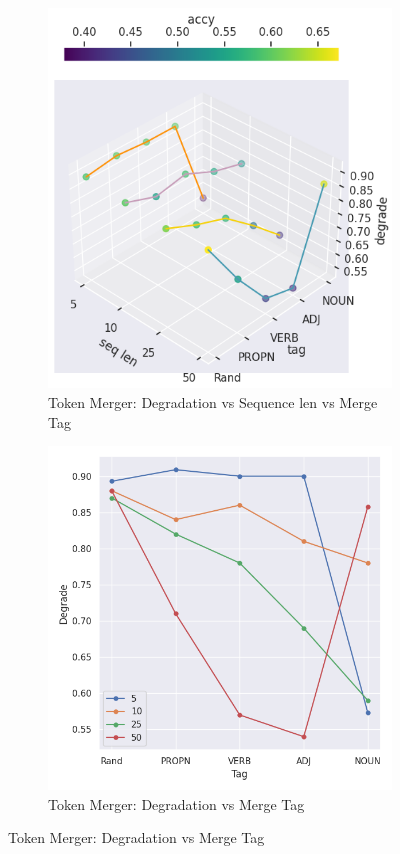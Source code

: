 \documentclass[12pt]{article}
\begin{document}
\begin{figure} [!h]
\begin{center}
\begin{subfigure}[h]{0.4\linewidth} 
\includegraphics[width=\linewidth]{figures/tokenmerg1.png}
\caption{Token Merger: Degradation vs Sequence len vs Merge Tag}
\label{fig:mergeScatter1}
\end{subfigure}
\hfill
\begin{subfigure}[h]{0.4\linewidth} 
\includegraphics[width=\linewidth]{figures/tokenmerg2.png}
\caption{Token Merger: Degradation vs Merge Tag}
\label{fig:mergeScatter2}
\end{subfigure}
\end{center}
\end{figure}
\end{document}
